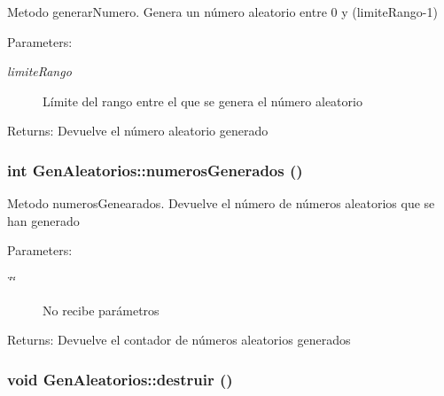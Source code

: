 Metodo generarNumero. Genera un número aleatorio entre 0 y (limiteRango-1) \begin{Desc}
\item[Parameters:]
\begin{description}
\item[{\em limiteRango}]Límite del rango entre el que se genera el número aleatorio \end{description}
\end{Desc}
\begin{Desc}
\item[Returns:]Devuelve el número aleatorio generado \end{Desc}
\hypertarget{classGenAleatorios_1ca28fbc4c69c19d61d147abb04e67fb}{
\subsubsection[numerosGenerados]{\setlength{\rightskip}{0pt plus 5cm}int GenAleatorios::numerosGenerados ()}}
\label{classGenAleatorios_1ca28fbc4c69c19d61d147abb04e67fb}


Metodo numerosGenearados. Devuelve el número de números aleatorios que se han generado \begin{Desc}
\item[Parameters:]
\begin{description}
\item[{\em \char`\"{}\char`\"{}}]No recibe parámetros \end{description}
\end{Desc}
\begin{Desc}
\item[Returns:]Devuelve el contador de números aleatorios generados \end{Desc}
\hypertarget{classGenAleatorios_702ffff747c51573caf3fb29fa16639b}{
\subsubsection[destruir]{\setlength{\rightskip}{0pt plus 5cm}void GenAleatorios::destruir ()}}
\label{classGenAleatorios_702ffff747c51573caf3fb29fa16639b}


